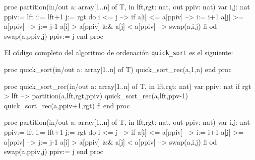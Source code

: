\begin{pascallike}
proc partition(in/out a: array[1..n] of T, in lft,rgt: nat, out ppiv: nat)
    var i,j: nat
    ppiv:= lft
    i:= lft+1
    j:= rgt
    do i <= j --> if a[i] <= a[ppiv] --> i:= i+1
                     a[j] >= a[ppiv] --> j:= j-1
                     a[i] > a[ppiv] && a[j] < a[ppiv] --> swap(a,i,j)
                  fi
    od
    swap(a,ppiv,j)
    ppiv:= j
end proc
\end{pascallike}
\newpage
El código completo del algoritmo de ordenación \texttt{quick\_sort} es el siguiente:
\begin{pascallike}
proc quick_sort(in/out a: array[1..n] of T)
    quick_sort_rec(a,1,n)
end proc

proc quick_sort_rec(in/out a: array[1..n] of T, in lft,rgt: nat)
    var ppiv: nat
    if rgt > lft --> 
        partition(a,lft,rgt,ppiv)
        quick_sort_rec(a,lft,ppv-1)
        quick_sort_rec(a,ppiv+1,rgt)
    fi
end proc

proc partition(in/out a: array[1..n] of T, in lft,rgt: nat, out ppiv: nat)
    var i,j: nat
    ppiv:= lft
    i:= lft+1
    j:= rgt
    do i <= j --> if a[i] <= a[ppiv] --> i:= i+1
                     a[j] >= a[ppiv] --> j:= j-1
                     a[i] > a[ppiv] && a[j] < a[ppiv] --> swap(a,i,j)
                  fi
    od
    swap(a,ppiv,j)
    ppiv:= j
end proc
\end{pascallike}